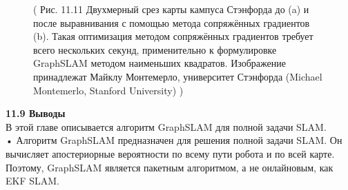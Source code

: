 \documentclass[10pt,a4paper]{article}
\begin{document}
\begin{figure}[H]
	\caption{ ( Рис. 11.11 Двухмерный срез карты кампуса Стэнфорда  до (a) и после выравнивания с помощью метода сопряжённых градиентов (b). Такая оптимизация методом сопряжённых градиентов требует всего нескольких секунд, применительно к формулировке GraphSLAM методом наименьших квадратов. Изображение принадлежат Майклу Монтемерло, университет Стэнфорда (Michael Montemerlo, Stanford University) ) }
	\label{fig:1111orig}
\end{figure}

\textbf{11.9	Выводы}\\

В этой главе описывается алгоритм GraphSLAM для полной задачи SLAM.\\

•	Алгоритм GraphSLAM предназначен для решения полной задачи SLAM. Он вычисляет апостериорные вероятности по всему пути робота и по всей карте. Поэтому, GraphSLAM является пакетным алгоритмом, а не онлайновым, как EKF SLAM.\\
\end{document}
